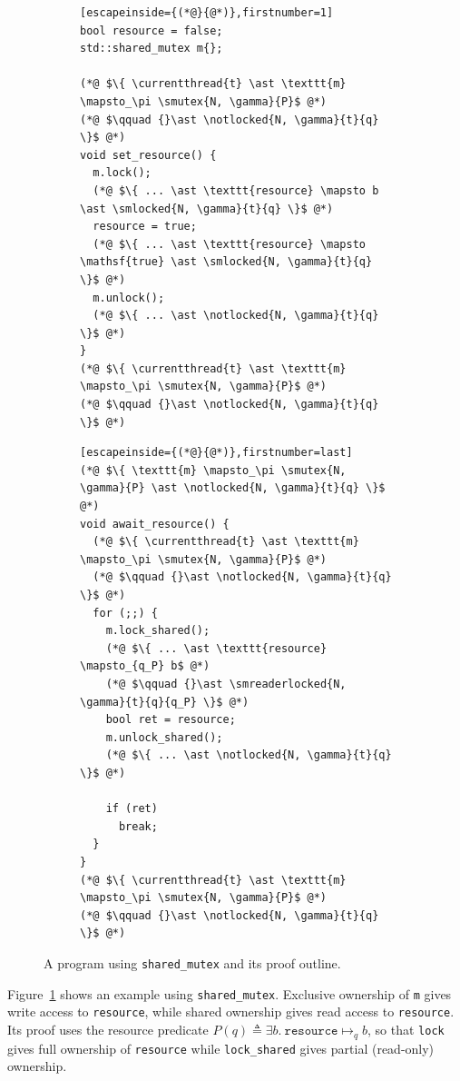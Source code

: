 \begin{figure}[htb]
\centering
\lstset{aboveskip=0pt,belowskip=0pt}
\begin{subfigure}[t]{0.49\textwidth}
\begin{lstlisting}[escapeinside={(*@}{@*)},firstnumber=1]
bool resource = false;
std::shared_mutex m{};

(*@ $\{ \currentthread{t} \ast \texttt{m} \mapsto_\pi \smutex{N, \gamma}{P}$ @*)
(*@ $\qquad {}\ast \notlocked{N, \gamma}{t}{q} \}$ @*)
void set_resource() {
  m.lock();
  (*@ $\{ ... \ast \texttt{resource} \mapsto b \ast \smlocked{N, \gamma}{t}{q} \}$ @*)
  resource = true;
  (*@ $\{ ... \ast \texttt{resource} \mapsto \mathsf{true} \ast \smlocked{N, \gamma}{t}{q} \}$ @*)
  m.unlock();
  (*@ $\{ ... \ast \notlocked{N, \gamma}{t}{q} \}$ @*)
}
(*@ $\{ \currentthread{t} \ast \texttt{m} \mapsto_\pi \smutex{N, \gamma}{P}$ @*)
(*@ $\qquad {}\ast \notlocked{N, \gamma}{t}{q} \}$ @*)
\end{lstlisting}
\end{subfigure}\hfill
\begin{subfigure}[t]{0.49\textwidth}
\begin{lstlisting}[escapeinside={(*@}{@*)},firstnumber=last]
(*@ $\{ \texttt{m} \mapsto_\pi \smutex{N, \gamma}{P} \ast \notlocked{N, \gamma}{t}{q} \}$ @*)
void await_resource() {
  (*@ $\{ \currentthread{t} \ast \texttt{m} \mapsto_\pi \smutex{N, \gamma}{P}$ @*)
  (*@ $\qquad {}\ast \notlocked{N, \gamma}{t}{q} \}$ @*)
  for (;;) {
    m.lock_shared();
    (*@ $\{ ... \ast \texttt{resource} \mapsto_{q_P} b$ @*)
    (*@ $\qquad {}\ast \smreaderlocked{N, \gamma}{t}{q}{q_P} \}$ @*)
    bool ret = resource;
    m.unlock_shared();
    (*@ $\{ ... \ast \notlocked{N, \gamma}{t}{q} \}$ @*)
    
    if (ret)
      break;
  }
}
(*@ $\{ \currentthread{t} \ast \texttt{m} \mapsto_\pi \smutex{N, \gamma}{P}$ @*)
(*@ $\qquad {}\ast \notlocked{N, \gamma}{t}{q} \}$ @*)
\end{lstlisting}
\end{subfigure}
\caption{A program using \lstinline{shared_mutex} and its proof outline.}
\label{shared-mutex-ex-proof}
\end{figure}
Figure~\ref{shared-mutex-ex-proof} shows an example using \lstinline{shared_mutex}. Exclusive ownership of \lstinline{m} gives write access to \lstinline{resource}, while shared ownership gives read access to \lstinline{resource}. Its proof uses the resource predicate $P(q) \triangleq \exists b.\ \texttt{resource} \mapsto_q b$, so that \lstinline{lock} gives full ownership of \lstinline{resource} while \lstinline{lock_shared} gives partial (read-only) ownership.

